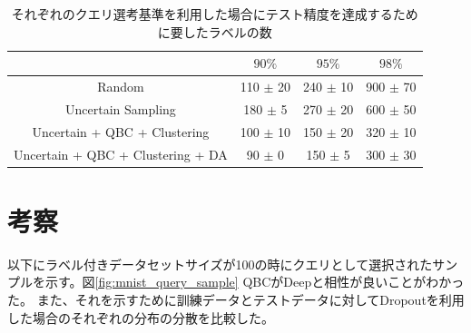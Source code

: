 \begin{table}[b]
    \label{table:mnist_samplenum_accuracy}
    \caption{それぞれのクエリ選考基準を利用した場合にテスト精度を達成するために要したラベルの数}
    \center
    \begin{tabular}{c|c|c|c} 
         & $90\%$ & $95\%$ & $98\%$ \\ \hline
        Random & 110 $\pm$ 20 & 240 $\pm$ 10 & 900 $\pm$ 70 \\
        Uncertain Sampling & 180 $\pm$ 5 & 270 $\pm$ 20  & 600 $\pm$ 50 \\
        Uncertain + QBC + Clustering & 100 $\pm$ 10 & 150 $\pm$ 20 & 320 $\pm$ 10 \\ 
        Uncertain + QBC + Clustering + DA & 90 $\pm$ 0 & 150 $\pm$ 5 & 300 $\pm$ 30 \\

    \end{tabular}
\end{table}

\section{考察}
以下にラベル付きデータセットサイズが100の時にクエリとして選択されたサンプルを示す。図\ref{fig:mnist_query_sample}
QBCがDeepと相性が良いことがわかった。
また、それを示すために訓練データとテストデータに対してDropoutを利用した場合のそれぞれの分布の分散を比較した。
